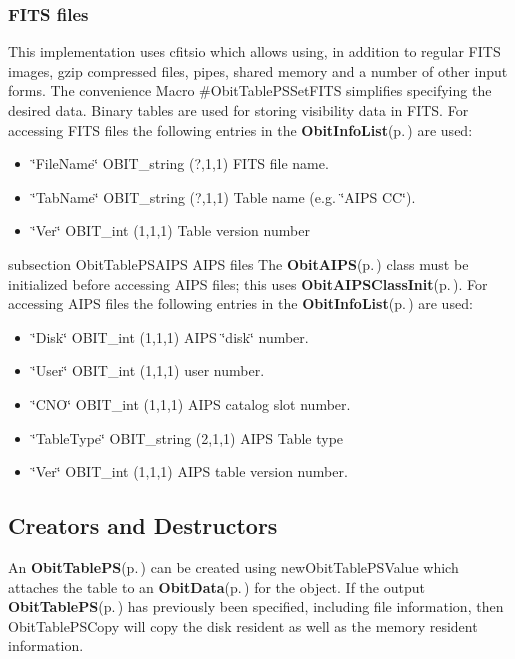 \subsubsection{FITS files}\label{ObitTableWX_8h_TableFITS}
This implementation uses cfitsio which allows using, in addition to regular FITS images, gzip compressed files, pipes, shared memory and a number of other input forms. The convenience Macro \#Obit\-Table\-PSSet\-FITS simplifies specifying the desired data. Binary tables are used for storing visibility data in FITS. For accessing FITS files the following entries in the {\bf Obit\-Info\-List}{\rm (p.\,\pageref{structObitInfoList})} are used: \begin{itemize}
\item \char`\"{}File\-Name\char`\"{} OBIT\_\-string (?,1,1) FITS file name. \item \char`\"{}Tab\-Name\char`\"{} OBIT\_\-string (?,1,1) Table name (e.g. \char`\"{}AIPS CC\char`\"{}). \item \char`\"{}Ver\char`\"{} OBIT\_\-int (1,1,1) Table version number\end{itemize}
subsection Obit\-Table\-PSAIPS AIPS files The {\bf Obit\-AIPS}{\rm (p.\,\pageref{structObitAIPS})} class must be initialized before accessing AIPS files; this uses {\bf Obit\-AIPSClass\-Init}{\rm (p.\,\pageref{ObitAIPS_8c_a5})}. For accessing AIPS files the following entries in the {\bf Obit\-Info\-List}{\rm (p.\,\pageref{structObitInfoList})} are used: \begin{itemize}
\item \char`\"{}Disk\char`\"{} OBIT\_\-int (1,1,1) AIPS \char`\"{}disk\char`\"{} number. \item \char`\"{}User\char`\"{} OBIT\_\-int (1,1,1) user number. \item \char`\"{}CNO\char`\"{} OBIT\_\-int (1,1,1) AIPS catalog slot number. \item \char`\"{}Table\-Type\char`\"{} OBIT\_\-string (2,1,1) AIPS Table type \item \char`\"{}Ver\char`\"{} OBIT\_\-int (1,1,1) AIPS table version number.\end{itemize}
\subsection{Creators and Destructors}\label{ObitTablePS_8h_ObitTablePSaccess}
An {\bf Obit\-Table\-PS}{\rm (p.\,\pageref{structObitTablePS})} can be created using new\-Obit\-Table\-PSValue which attaches the table to an {\bf Obit\-Data}{\rm (p.\,\pageref{structObitData})} for the object. If the output {\bf Obit\-Table\-PS}{\rm (p.\,\pageref{structObitTablePS})} has previously been specified, including file information, then Obit\-Table\-PSCopy will copy the disk resident as well as the memory resident information.

